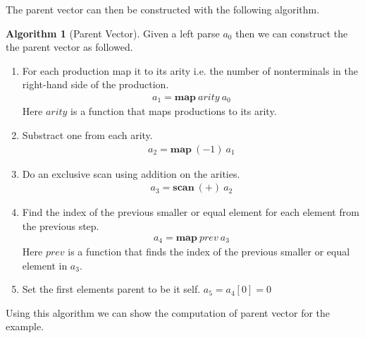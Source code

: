 \documentclass[a4paper,12pt]{article}
\theoremstyle{definition}
\newtheorem{algorithm}{Algorithm}[section]
\begin{document}
The parent vector can then be constructed with the following algorithm.
\begin{algorithm}[Parent Vector]\label{algo:parent}
  Given a left parse $a_0$ then we can construct the the parent vector as followed.
  \begin{enumerate}
    \item For each production map it to its arity i.e. the number of nonterminals in the right-hand side of the production.
    \begin{align*}
      a_1 = \mathbf{map} \: arity \: a_0
    \end{align*}
    Here $arity$ is a function that maps productions to its arity.
    \item Substract one from each arity.
    \begin{align*}
      a_2 = \mathbf{map} \: (-1) \: a_1
    \end{align*}
    \item Do an exclusive scan using addition on the arities.
    \begin{align*}
      a_3 = \mathbf{scan} \: (+) \: a_2
    \end{align*}
    \item Find the index of the previous smaller or equal element for each element from the previous step. 
    \begin{align*}
      a_4 = \mathbf{map} \: prev \: a_3
    \end{align*}
    Here $prev$ is a function that finds the index of the previous smaller or equal element in $a_3$.
    \item Set the first elements parent to be it self. $a_5 = a_4[0] = 0$
  \end{enumerate}
\end{algorithm}
\noindent Using this algorithm we can show the computation of parent vector for the example.
\end{document}
